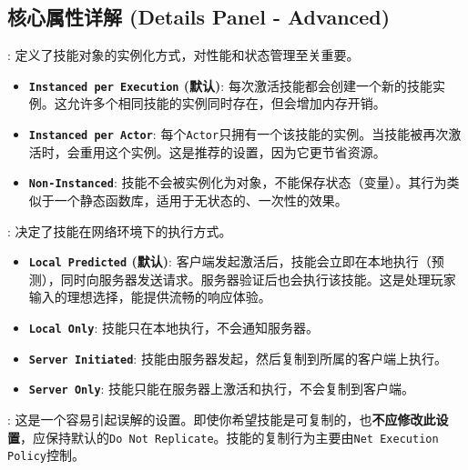 \documentclass[math,code,10pt,CJKmath]{amznotes}
\newcommand{\il}[1]{\texttt{#1}}%
\begin{document}
\subsection{核心属性详解 (Details Panel - Advanced)}
\begin{description}
    \item {}: 定义了技能对象的实例化方式，对性能和状态管理至关重要。
    \begin{itemize}
        \item \textbf{\texttt{Instanced per Execution} (默认)}: 每次激活技能都会创建一个新的技能实例。这允许多个相同技能的实例同时存在，但会增加内存开销。
        \item \textbf{\texttt{Instanced per Actor}}: 每个\texttt{Actor}只拥有一个该技能的实例。当技能被再次激活时，会重用这个实例。这是推荐的设置，因为它更节省资源。
        \item \textbf{\texttt{Non-Instanced}}: 技能不会被实例化为对象，不能保存状态（变量）。其行为类似于一个静态函数库，适用于无状态的、一次性的效果。
    \end{itemize}
    
    \item{}: 决定了技能在网络环境下的执行方式。
    \begin{itemize}
        \item \textbf{\texttt{Local Predicted} (默认)}: 客户端发起激活后，技能会立即在本地执行（预测），同时向服务器发送请求。服务器验证后也会执行该技能。这是处理玩家输入的理想选择，能提供流畅的响应体验。
        \item \textbf{\texttt{Local Only}}: 技能只在本地执行，不会通知服务器。
        \item \textbf{\texttt{Server Initiated}}: 技能由服务器发起，然后复制到所属的客户端上执行。
        \item \textbf{\texttt{Server Only}}: 技能只能在服务器上激活和执行，不会复制到客户端。
    \end{itemize}
    
    \item{}: 这是一个容易引起误解的设置。即使你希望技能是可复制的，也\textbf{不应修改此设置}，应保持默认的\il{Do Not Replicate}。技能的复制行为主要由\il{Net Execution Policy}控制。
    

\end{description}
\end{document}
